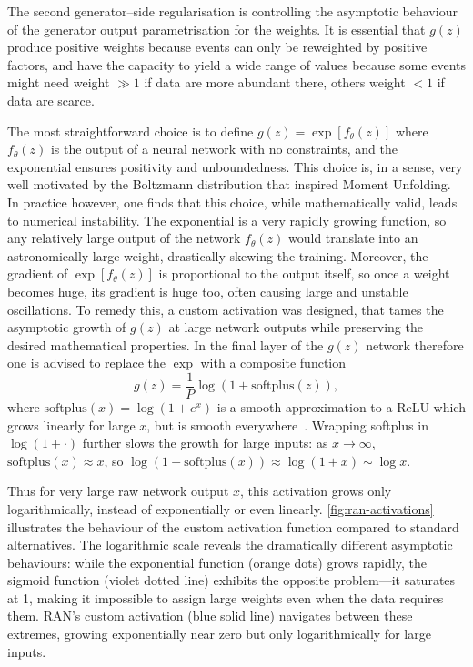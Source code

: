 {{            The second generator--side regularisation is controlling the asymptotic behaviour of the generator output parametrisation for the weights.
            It is essential that $g(z)$ produce positive weights because events can only be reweighted by positive factors, and have the capacity to yield a wide range of values  because some events might need weight $\gg 1$ if data are more abundant there, others weight $<1$ if data are scarce. 
            
            The most straightforward choice is to define $g(z) = \exp[f_\theta(z)]$ where $f_\theta(z)$ is the output of a neural network with no constraints, and the exponential ensures positivity and unboundedness.
            This choice is, in a sense, very well motivated by the Boltzmann distribution that inspired Moment Unfolding.
            In practice however, one finds that this choice, while mathematically valid, leads to numerical instability.
            The exponential is a very rapidly growing function, so any relatively large output of the network $f_\theta(z)$ would translate into an astronomically large weight, drastically skewing the training.
            Moreover, the gradient of $\exp[f_\theta(z)]$ is proportional to the output itself, so once a weight becomes huge, its gradient is huge too, often causing large and unstable oscillations.
            To remedy this, a custom activation was designed, that tames the asymptotic growth of $g(z)$ at large network outputs while preserving the desired mathematical properties.
            In the final layer of the $g(z)$ network therefore one is advised to replace the $\exp$ with a composite function
            \[
                g(z) = \frac1P\log(1 + \mathrm{softplus}(z)),
            \]
            where $\mathrm{softplus}(x) = \log(1+e^x)$ is a smooth approximation to a ReLU which grows linearly for large $x$, but is smooth everywhere~\cite{dugas_incorporating_2000, glorot_deep_2011}.
            Wrapping softplus in $\log(1+\cdot)$ further slows the growth for large inputs: as $x \to \infty$, $\mathrm{softplus}(x)\approx x$, so $\log(1+\mathrm{softplus}(x)) \approx \log(1+x) \sim \log x$.
            
            Thus for very large raw network output $x$, this activation grows only logarithmically, instead of exponentially or even linearly.
\cref{fig:ran-activations} illustrates the behaviour of the custom activation function compared to standard alternatives. The logarithmic scale reveals the dramatically different asymptotic behaviours: while the exponential function (orange dots) grows rapidly, the sigmoid function (violet dotted line) exhibits the opposite problem---it saturates at 1, making it impossible to assign large weights even when the data requires them. RAN's custom activation (blue solid line) navigates between these extremes, growing exponentially near zero but only logarithmically for large inputs.

}}
